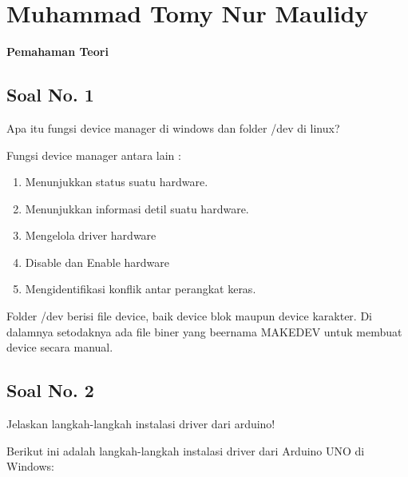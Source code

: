 
\section{Muhammad Tomy Nur Maulidy}
{\Large \textbf{Pemahaman Teori}}
\subsection{Soal No. 1}
Apa itu fungsi device manager di windows dan folder /dev di linux?

\hfill \break
Fungsi device manager antara lain :
\begin{enumerate}
	\item Menunjukkan status suatu hardware.
	\item Menunjukkan informasi detil suatu hardware.
	\item Mengelola driver hardware
	\item Disable dan Enable hardware
	\item Mengidentifikasi konflik antar perangkat keras.
\end{enumerate}

\hfill \break
Folder /dev berisi file device, baik device blok maupun device karakter. Di dalamnya setodaknya ada file biner yang beernama MAKEDEV untuk membuat device secara manual.

\subsection{Soal No. 2}
Jelaskan langkah-langkah instalasi driver dari arduino!

\hfill \break
Berikut ini adalah langkah-langkah instalasi driver dari Arduino UNO di Windows:

